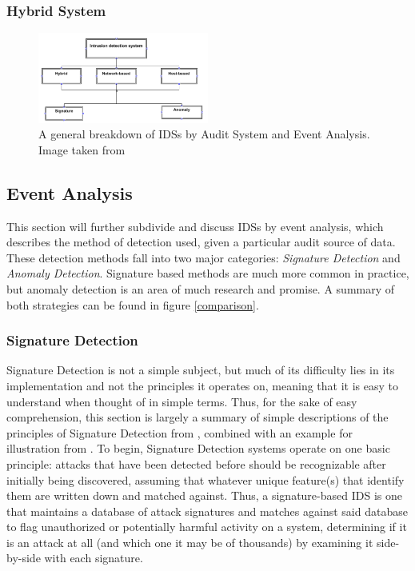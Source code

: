 \documentclass{acm_proc_article-sp}
\begin{document}
    	\subsubsection{Hybrid System}
    	\begin{figure}[h!]
			\centering
			\includegraphics[width=0.5\textwidth]{idsBreakdown.png}
			\caption{A general breakdown of IDSs by Audit System and Event Analysis. Image taken from \cite{Alenezi2012}}
			\label{breakdown}
	\end{figure}
    \subsection{Event Analysis}
   		This section will further subdivide and discuss IDSs by event analysis, which describes the method of detection used, given a particular audit source of data. These detection methods fall into two major categories: \emph{Signature Detection} and \emph{Anomaly Detection}. Signature based methods are much more common in practice, but anomaly detection is an area of much research and promise. A summary of both strategies can be found in figure \ref{comparison}.
	    \subsubsection{Signature Detection} 
	    	Signature Detection is not a simple subject, but much of its difficulty lies in its implementation and not the principles it operates on, meaning that it is easy to understand when thought of in simple terms. Thus, for the sake of easy comprehension, this section is largely a summary of simple descriptions of the principles of Signature Detection from \cite{Taylor2006}, combined with an example for illustration from \cite{Labs1999}. To begin, Signature Detection systems operate on one basic principle: attacks that have been detected before should be recognizable after initially being discovered, assuming that whatever unique feature(s) that identify them are written down and matched against. Thus, a signature-based IDS is one that maintains a database of attack signatures and matches against said database to flag unauthorized or potentially harmful activity on a system, determining if it is an attack at all (and which one it may be of thousands) by examining it side-by-side with each signature. 
	    	
\end{document}
